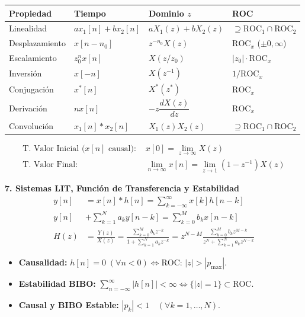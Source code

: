 \documentclass[10pt, a4paper, twocolumn]{article}
\begin{document}
{\scriptsize
\setlength{\tabcolsep}{2.5pt}
\renewcommand{\arraystretch}{1.25}
\begin{tabular}{@{}llll@{}}
\toprule
\textbf{Propiedad} & \textbf{Tiempo} & \textbf{Dominio $z$} & \textbf{ROC} \\
\midrule
Linealidad & $a x_1[n] + b x_2[n]$ & $a X_1(z) + b X_2(z)$ & $\supseteq \text{ROC}_1 \cap \text{ROC}_2$ \\
Desplazamiento & $x[n - n_0]$ & $z^{-n_0} X(z)$ & $\text{ROC}_x$ ($\pm 0, \infty$) \\
Escalamiento & $z_0^n x[n]$ & $X(z / z_0)$ & $|z_0| \cdot \text{ROC}_x$ \\
Inversión & $x[-n]$ & $X(z^{-1})$ & $1 / \text{ROC}_x$ \\
Conjugación & $x^*[n]$ & $X^*(z^*)$ & $\text{ROC}_x$ \\
Derivación & $n x[n]$ & $-z \dfrac{dX(z)}{dz}$ & $\text{ROC}_x$ \\
Convolución & $x_1[n] * x_2[n]$ & $X_1(z) X_2(z)$ & $\supseteq \text{ROC}_1 \cap \text{ROC}_2$ \\
\bottomrule
\end{tabular}
}
\begin{align*}
    \text{T. Valor Inicial ($x[n]$ causal): } & x[0] = \lim_{z \to \infty} X(z) \\
    \text{T. Valor Final: } & \lim_{n \to \infty} x[n] = \lim_{z \to 1} (1 - z^{-1}) X(z)
\end{align*}

\vspace{2pt}
\textbf{7. Sistemas LIT, Función de Transferencia y Estabilidad}
\begin{align*}
    y[n] &= x[n] * h[n] = \sum_{k=-\infty}^{\infty} x[k] h[n - k] \\
    y[n] &+ \sum_{k=1}^{N} a_k y[n-k] = \sum_{k=0}^{M} b_k x[n-k] \\
    H(z) &= \frac{Y(z)}{X(z)} = \frac{\sum_{k=0}^{M} b_k z^{-k}}{1 + \sum_{k=1}^{N} a_k z^{-k}} = z^{N-M} \frac{\sum_{k=0}^{M} b_k z^{M-k}}{z^N + \sum_{k=1}^{N} a_k z^{N-k}}
\end{align*}
\begin{itemize}
    \item \textbf{Causalidad:} $h[n] = 0 \; (\forall n < 0) \iff \text{ROC: } |z| > |p_{\max}|$.
    \item \textbf{Estabilidad BIBO:} $\sum_{n=-\infty}^{\infty} |h[n]| < \infty \iff \{|z| = 1\} \subset \text{ROC}$.
    \item \textbf{Causal y BIBO Estable:} $|p_k| < 1 \quad (\forall k = 1, \dots, N)$.
\end{itemize}
\end{document}
